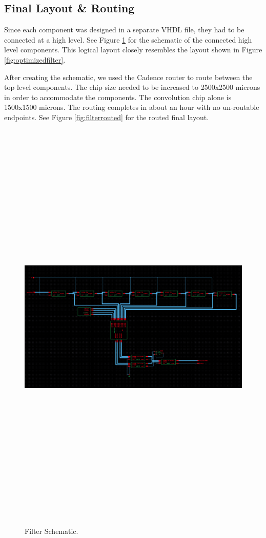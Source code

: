 \subsection{Final Layout \& Routing}
Since each component was designed in a separate VHDL file, they had to be connected at a high level.  See Figure \ref{fig:filterschematic} for the schematic of the connected high level components.  This logical layout closely resembles the layout shown in Figure \ref{fig:optimizedfilter}.

After creating the schematic, we used the Cadence router to route between the top level components.  The chip size needed to be increased to 2500x2500 microns in order to accommodate the components.  The convolution chip alone is 1500x1500 microns.  The routing completes in about an hour with no un-routable endpoints.  See Figure \ref{fig:filterrouted} for the routed final layout.


\begin{figure}[htbp]
\centering
\includegraphics[angle=90,height=8in]{images/Filter-Schematic}
\caption{Filter Schematic.}
\label{fig:filterschematic}
\end{figure}


